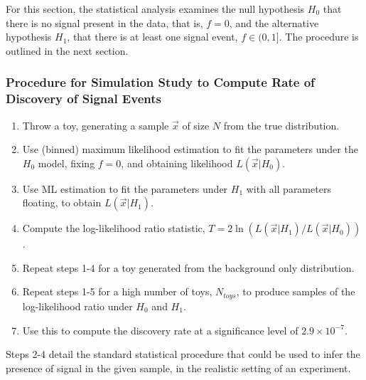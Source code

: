 \documentclass[12pt]{article}
\begin{document}
For this section, the statistical analysis examines the null hypothesis $H_0$ that there is no signal present in the data, that is, $f=0$, and the alternative hypothesis $H_1$, that there is at least one signal event, $f\in(0,1]$.
The procedure is outlined in the next section.
\subsubsection*{Procedure for Simulation Study to Compute Rate of Discovery of Signal Events}
\begin{enumerate}
    \item Throw a toy, generating a sample $\vec{x}$ of size $N$ from the true distribution.
    \item Use (binned) maximum likelihood estimation to fit the parameters under the $H_0$ model, fixing $f=0$, and obtaining likelihood $L(\vec{x}|H_0)$.
    \item Use ML estimation to fit the parameters under $H_1$ with all parameters floating, to obtain $L(\vec{x}|H_1)$.
    \item Compute the log-likelihood ratio statistic, $T = 2\ln(L(\vec{x}|H_1)/L(\vec{x}|H_0))$.
    \item Repeat steps 1-4 for a toy generated from the background only distribution.
    \item Repeat steps 1-5 for a high number of toys, $N_{toys}$, to produce samples of the log-likelihood ratio under $H_0$ and $H_1$.
    \item Use this to compute the discovery rate at a significance level of $2.9\times10^{-7}$.
\end{enumerate}
Steps 2-4 detail the standard statistical procedure that could be used to infer the presence of signal in the given sample, in the realistic setting of an experiment.
\end{document}

